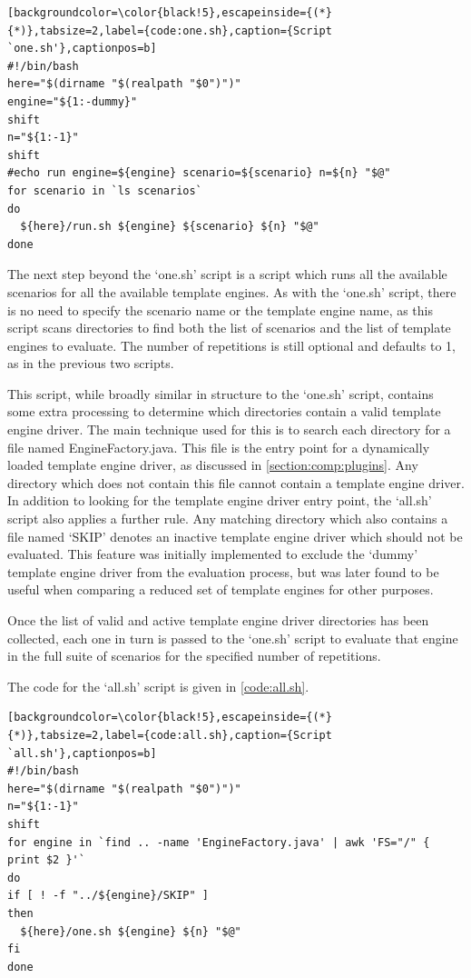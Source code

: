 \begin{lstlisting}[backgroundcolor=\color{black!5},escapeinside={(*}{*)},tabsize=2,label={code:one.sh},caption={Script `one.sh'},captionpos=b]
#!/bin/bash
here="$(dirname "$(realpath "$0")")"
engine="${1:-dummy}"
shift
n="${1:-1}"
shift
#echo run engine=${engine} scenario=${scenario} n=${n} "$@"
for scenario in `ls scenarios`
do
  ${here}/run.sh ${engine} ${scenario} ${n} "$@"
done
\end{lstlisting}

The next step beyond the `one.sh' script is a script which runs all the available scenarios for all the available template engines. As with the `one.sh' script, there is no need to specify the scenario name or the template engine name, as this script scans directories to find both the list of scenarios and the list of template engines to evaluate. The number of repetitions is still optional and defaults to 1, as in the previous two scripts.

This script, while broadly similar in structure to the `one.sh' script, contains some extra processing to determine which directories contain a valid template engine driver. The main technique used for this is to search each directory for a file named EngineFactory.java. This file is the entry point for a dynamically loaded template engine driver, as discussed in \autoref{section:comp:plugins}. Any directory which does not contain this file cannot contain a template engine driver. In addition to looking for the template engine driver entry point, the `all.sh' script also applies a further rule. Any matching directory which also contains a file named `SKIP' denotes an inactive template engine driver which should not be evaluated. This feature was initially implemented to exclude the `dummy' template engine driver from the evaluation process, but was later found to be useful when comparing a reduced set of template engines for other purposes.

Once the list of valid and active template engine driver directories has been collected, each one in turn is passed to the `one.sh' script to evaluate that engine in the full suite of scenarios for the specified number of repetitions.

The code for the `all.sh' script is given in \autoref{code:all.sh}.

\begin{lstlisting}[backgroundcolor=\color{black!5},escapeinside={(*}{*)},tabsize=2,label={code:all.sh},caption={Script `all.sh'},captionpos=b]
#!/bin/bash
here="$(dirname "$(realpath "$0")")"
n="${1:-1}"
shift
for engine in `find .. -name 'EngineFactory.java' | awk 'FS="/" { print $2 }'`
do
if [ ! -f "../${engine}/SKIP" ]
then
  ${here}/one.sh ${engine} ${n} "$@"
fi
done
\end{lstlisting}

